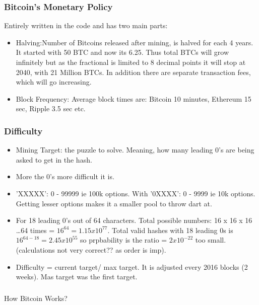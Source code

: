 \begin{frame}[fragile]\frametitle{Bitcoin's Monetary Policy}
Entirely written in the code and has two main parts:
\begin{itemize}
\item Halving:Number of Bitcoins released after mining, is halved for each 4 years. It started with 50 BTC and now its 6.25. Thus total BTCs will grow infinitely but as the fractional is limited to 8 decimal points it will stop at 2040, with 21 Million BTCs. In addition there are separate transaction fees, which will go increasing.
\item Block Frequency: Average block times are: Bitcoin 10 minutes, Ethereum 15 sec, Ripple 3.5 sec etc.
\end{itemize}
\end{frame}

\begin{frame}[fragile]\frametitle{Difficulty}
\begin{itemize}
\item Mining Target: the puzzle to solve. Meaning, how many leading 0's are being asked to get in the hash.
\item More the 0's more difficult it is.
\item 'XXXXX': 0 - 99999 ie 100k options. With '0XXXX': 0 - 9999 ie 10k options. Getting lesser options makes it a smaller pool to throw dart at.
\item For 18 leading 0's out of 64 characters. Total possible numbers: 16 x 16 x 16 \ldots 64 times = $16^{64}=1.15x10^{77}$. Total valid hashes with 18 leading 0s is $16^{64-18} = 2.45x10^{55}$ so prpbability is the ratio = $2x10^{-22}$ too small. (calculations not very correct?? as order is imp).
\item Difficulty = current target/ max target. It is adjusted every 2016 blocks (2 weeks). Mas target was the first target.
\end{itemize}
\end{frame}




\begin{frame}[fragile]\frametitle{}
\begin{center}
{\Large How Bitcoin Works?}
\end{center}
\end{frame}

